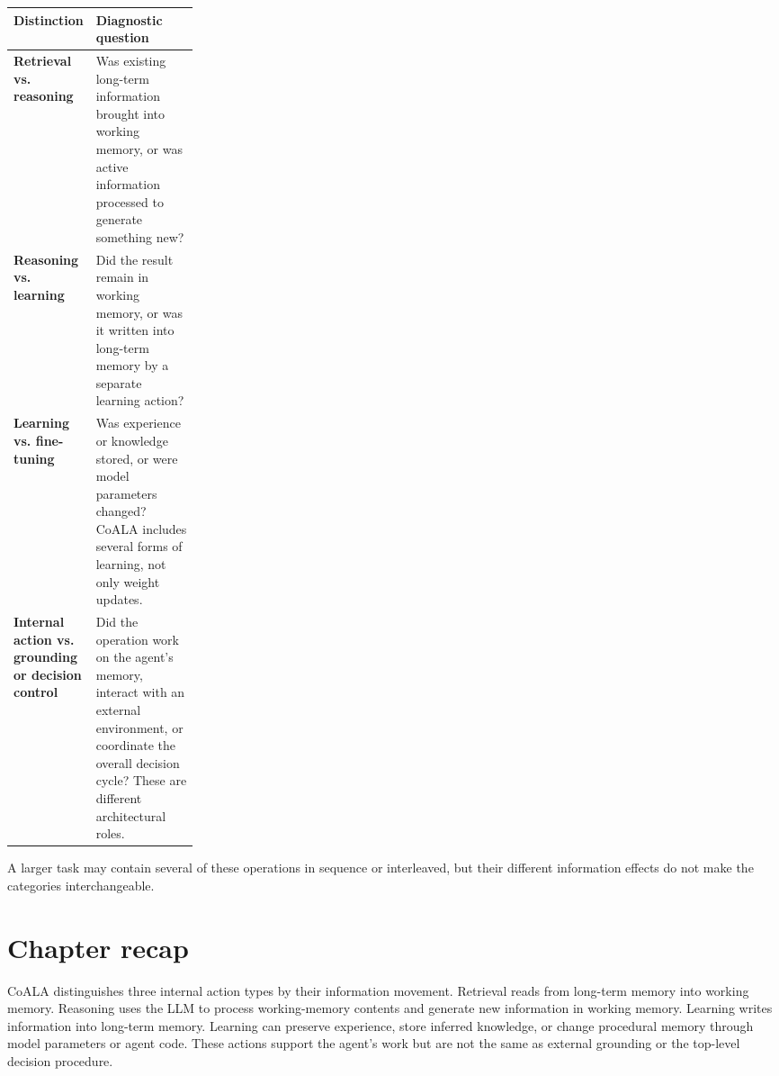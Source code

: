 \begin{center}
\begin{tabularx}{\linewidth}{@{}>{\bfseries}p{0.24\linewidth}X@{}}
\toprule
Distinction & Diagnostic question \\
\midrule
Retrieval vs. reasoning & Was existing long-term information brought into working memory, or was active information processed to generate something new? \\
Reasoning vs. learning & Did the result remain in working memory, or was it written into long-term memory by a separate learning action? \\
Learning vs. fine-tuning & Was experience or knowledge stored, or were model parameters changed? CoALA includes several forms of learning, not only weight updates. \\
Internal action vs. grounding or decision control & Did the operation work on the agent's memory, interact with an external environment, or coordinate the overall decision cycle? These are different architectural roles. \\
\bottomrule
\end{tabularx}
\end{center}

A larger task may contain several of these operations in sequence or interleaved, but their different information effects do not make the categories interchangeable.

\section{Chapter recap}

\begin{chapterrecap}
CoALA distinguishes three internal action types by their information movement. Retrieval reads from long-term memory into working memory. Reasoning uses the LLM to process working-memory contents and generate new information in working memory. Learning writes information into long-term memory. Learning can preserve experience, store inferred knowledge, or change procedural memory through model parameters or agent code. These actions support the agent's work but are not the same as external grounding or the top-level decision procedure.
\end{chapterrecap}

